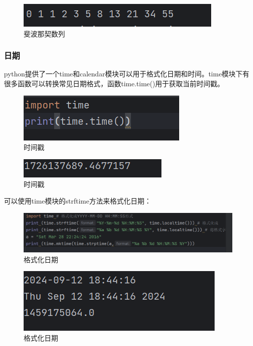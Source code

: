 \documentclass{ctexart}
\begin{document}
	\begin{figure}[H]
		\centering
		\includegraphics[scale=0.5]{3.60}
		\caption{斐波那契数列}
	\end{figure}
	
	\subsubsection{日期}
	python提供了一个time和calendar模块可以用于格式化日期和时间。time模块下有很多函数可以转换常见日期格式，函数time.time()用于获取当前时间戳。
	
	\begin{figure}[H]
		\centering
		\includegraphics[scale=0.5]{3.61}
		\caption{时间戳}
	\end{figure}
	
	\begin{figure}[H]
		\centering
		\includegraphics[scale=0.5]{3.62}
		\caption{时间戳}
	\end{figure}
	
	可以使用time模块的strftime方法来格式化日期：
	
	\begin{figure}[H]
		\centering
		\includegraphics[scale=0.5]{3.63}
		\caption{格式化日期}
	\end{figure}
	
	\begin{figure}[H]
		\centering
		\includegraphics[scale=0.5]{3.64}
		\caption{格式化日期}
	\end{figure}
	
\end{document}
